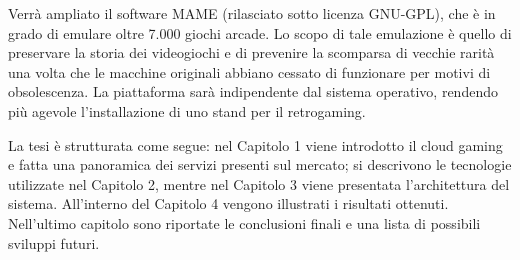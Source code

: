 Verrà ampliato il software MAME (rilasciato sotto licenza GNU-GPL), che è in grado di emulare  oltre 7.000 giochi arcade. Lo scopo di tale emulazione è quello di preservare la storia dei videogiochi e di prevenire la scomparsa di vecchie rarità una volta che le macchine originali abbiano cessato di funzionare per motivi di obsolescenza. La piattaforma sarà indipendente dal sistema operativo, rendendo più agevole l’installazione di uno stand per il retrogaming.

La tesi è strutturata come segue: nel Capitolo 1 viene introdotto il cloud gaming e fatta una panoramica dei servizi presenti sul mercato; si descrivono le tecnologie utilizzate nel Capitolo 2, mentre nel Capitolo 3 viene presentata l'architettura del sistema. All’interno del Capitolo 4 vengono illustrati i risultati ottenuti. Nell'ultimo capitolo sono riportate le conclusioni finali e una lista di possibili sviluppi futuri.